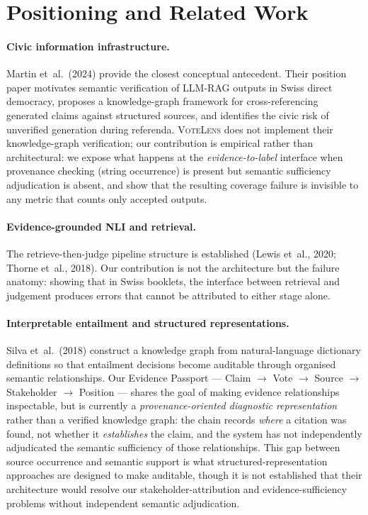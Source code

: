 \documentclass[10pt,a4paper]{article}
\newcommand{\votelens}{\textsc{VoteLens}}
\begin{document}
\section{Positioning and Related Work}

\paragraph{Civic information infrastructure.}
Martin et~al.~(2024) provide the closest conceptual antecedent. Their position paper motivates semantic verification of LLM-RAG outputs in Swiss direct democracy, proposes a knowledge-graph framework for cross-referencing generated claims against structured sources, and identifies the civic risk of unverified generation during referenda. \votelens{} does not implement their knowledge-graph verification; our contribution is empirical rather than architectural: we expose what happens at the \emph{evidence-to-label} interface when provenance checking (string occurrence) is present but semantic sufficiency adjudication is absent, and show that the resulting coverage failure is invisible to any metric that counts only accepted outputs.

\paragraph{Evidence-grounded NLI and retrieval.}
The retrieve-then-judge pipeline structure is established (Lewis et~al., 2020; Thorne et~al., 2018). Our contribution is not the architecture but the failure anatomy: showing that in Swiss booklets, the interface between retrieval and judgement produces errors that cannot be attributed to either stage alone.

\paragraph{Interpretable entailment and structured representations.}
Silva et~al.~(2018) construct a knowledge graph from natural-language dictionary definitions so that entailment decisions become auditable through organised semantic relationships. Our Evidence Passport --- Claim $\to$ Vote $\to$ Source $\to$ Stakeholder $\to$ Position --- shares the goal of making evidence relationships inspectable, but is currently a \emph{provenance-oriented diagnostic representation} rather than a verified knowledge graph: the chain records \emph{where} a citation was found, not whether it \emph{establishes} the claim, and the system has not independently adjudicated the semantic sufficiency of those relationships. This gap between source occurrence and semantic support is what structured-representation approaches are designed to make auditable, though it is not established that their architecture would resolve our stakeholder-attribution and evidence-sufficiency problems without independent semantic adjudication.
\end{document}
